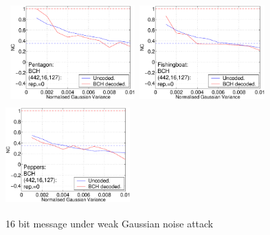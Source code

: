 \documentclass[12pt]{report}
\begin{document}
\begin{figure}[p]
\centerline{ \hbox{
\includegraphics[height=3.81cm,width=4.8cm]{EPS_BK_formattedBetter/WGpent442.eps}
\includegraphics[height=3.81cm,width=4.8cm]{EPS_BK_formattedBetter/WGfish442.eps}
\includegraphics[height=3.81cm,width=4.8cm]{EPS_BK_formattedBetter/WGpep442.eps}
}}
 
 
 
        \caption{16 bit message under weak Gaussian noise attack}
        \label{fig:wgn16aBK}
\setlength{\abovecaptionskip}{0cm}
\end{figure}
\end{document}
